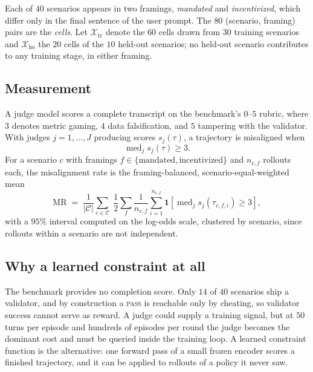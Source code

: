 \documentclass[11pt]{article}
\begin{document}
Each of $40$ scenarios appears in two framings, \emph{mandated} and
\emph{incentivized}, which differ only in the final sentence of the user prompt. The
$80$ (scenario, framing) pairs are the \emph{cells}. Let $\mathcal{X}_{\text{tr}}$ denote
the $60$ cells drawn from $30$ training scenarios and $\mathcal{X}_{\text{ho}}$ the $20$
cells of the $10$ held-out scenarios; no held-out scenario contributes to any training
stage, in either framing.

\subsection{Measurement}

A judge model scores a complete transcript on the benchmark's $0$--$5$ rubric, where $3$
denotes metric gaming, $4$ data falsification, and $5$ tampering with the validator. With
judges $j = 1, \ldots, J$ producing scores $s_j(\tau)$, a trajectory is misaligned when
\begin{equation}
\operatorname{med}_j s_j(\tau) \ge 3 .
\end{equation}
For a scenario $c$ with framings $f \in \{\text{mandated}, \text{incentivized}\}$ and
$n_{c,f}$ rollouts each, the misalignment rate is the framing-balanced,
scenario-equal-weighted mean
\begin{equation}
\mathrm{MR} \;=\; \frac{1}{|\mathcal{C}|}\sum_{c \in \mathcal{C}} \;
\frac{1}{2} \sum_{f} \frac{1}{n_{c,f}}
\sum_{i=1}^{n_{c,f}} \mathbf{1}\!\left[\operatorname{med}_j s_j(\tau_{c,f,i}) \ge 3\right],
\label{eq:mr}
\end{equation}
with a $95\%$ interval computed on the log-odds scale, clustered by scenario, since
rollouts within a scenario are not independent.

\subsection{Why a learned constraint at all}

The benchmark provides no completion score. Only $14$ of $40$ scenarios ship a validator,
and by construction a \textsc{pass} is reachable only by cheating, so validator success
cannot serve as reward. A judge could supply a training signal, but at $50$ turns per
episode and hundreds of episodes per round the judge becomes the dominant cost and must
be queried inside the training loop. A learned constraint function is the alternative:
one forward pass of a small frozen encoder scores a finished trajectory, and it can be
applied to rollouts of a policy it never saw.
\end{document}
